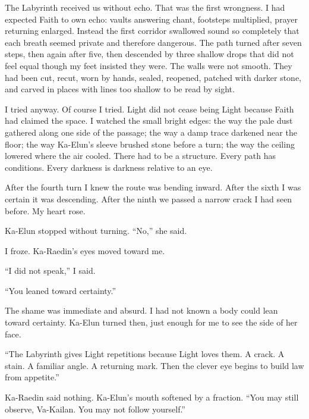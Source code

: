 The Labyrinth received us without echo. That was the first wrongness. I had expected Faith to own echo: vaults answering chant, footsteps multiplied, prayer returning enlarged. Instead the first corridor swallowed sound so completely that each breath seemed private and therefore dangerous. The path turned after seven steps, then again after five, then descended by three shallow drops that did not feel equal though my feet insisted they were. The walls were not smooth. They had been cut, recut, worn by hands, sealed, reopened, patched with darker stone, and carved in places with lines too shallow to be read by sight.\par

I tried anyway. Of course I tried. Light did not cease being Light because Faith had claimed the space. I watched the small bright edges: the way the pale dust gathered along one side of the passage; the way a damp trace darkened near the floor; the way Ka-Elun's sleeve brushed stone before a turn; the way the ceiling lowered where the air cooled. There had to be a structure. Every path has conditions. Every darkness is darkness relative to an eye.\par

After the fourth turn I knew the route was bending inward. After the sixth I was certain it was descending. After the ninth we passed a narrow crack I had seen before. My heart rose.\par

Ka-Elun stopped without turning. ``No,'' she said.\par

I froze. Ka-Raedin's eyes moved toward me.\par

``I did not speak,'' I said.\par

``You leaned toward certainty.''\par

The shame was immediate and absurd. I had not known a body could lean toward certainty. Ka-Elun turned then, just enough for me to see the side of her face.\par

``The Labyrinth gives Light repetitions because Light loves them. A crack. A stain. A familiar angle. A returning mark. Then the clever eye begins to build law from appetite.''\par

Ka-Raedin said nothing. Ka-Elun's mouth softened by a fraction. ``You may still observe, Va-Kailan. You may not follow yourself.''\par

